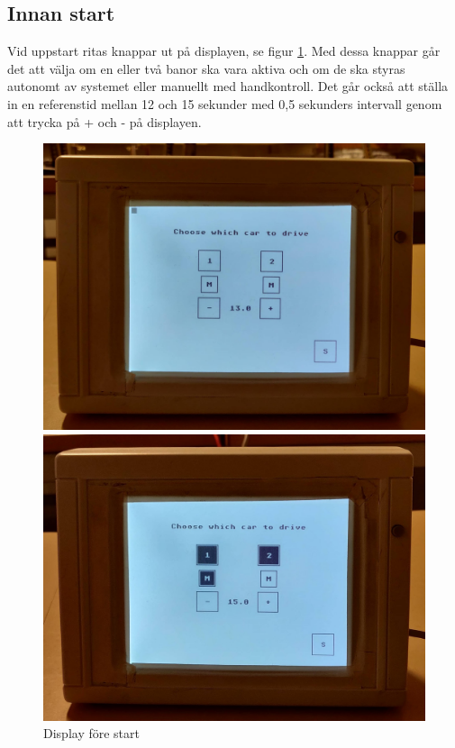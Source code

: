 \subsection{Innan start}

Vid uppstart ritas knappar ut på displayen, se figur \ref{fig:choose}. Med dessa knappar går
det att välja om en eller två banor ska vara aktiva och om de ska styras
autonomt av systemet eller manuellt med handkontroll. Det går också att ställa
in en referenstid mellan 12 och 15 sekunder med 0,5 sekunders intervall genom
att trycka på + och - på displayen. 
\begin{figure}
	\centering
	\includegraphics[width=0.75\linewidth] {Figures/choose1}

	\vspace*{2\floatsep}%

	\centering
	\includegraphics [width=0.75\linewidth] {Figures/choose2}
	\caption{Display före start}
	\label{fig:choose}
\end{figure}
